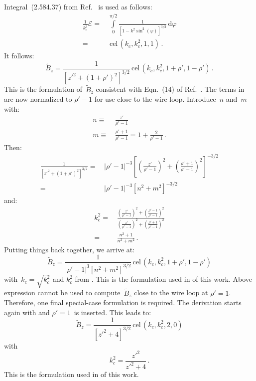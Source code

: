 Integral~(2.584.37) from Ref.~\cite{gradshteyn_ryzhik} is used as follows:
\begin{align}
  \frac{1}{k_c^2} \mathcal{E}
 =&\, \int\limits_0^{\pi/2}
        \frac{1}{\left[ 1 - k^2 \sin^2(\varphi) \right]^{3/2}}
        \,\mathrm{d}\varphi \nonumber \\
 =&\, \,\textrm{cel}\,(k_c, k_c^2, 1, 1) \, .
\end{align}
It follows:
\begin{equation}
  \tilde{B}_z
 = \frac{1}{\left[z'^2 + (1 + \rho')^2\right]^{3/2}} \,\textrm{cel}\,(k_c, k_c^2, 1 + \rho', 1 - \rho') \, . \label{eqn:cwl_B_z_14}
\end{equation}
This is the formulation of~$\tilde{B}_z$ consistent with Eqn.~(14) of Ref.~\cite{walstrom_2017}.
The terms in~ are now normalized to $\rho'-1$ for use close to the wire loop.
Introduce~$n$ and~$m$ with:
\begin{align}
  n \equiv&\, \frac{z'}{\rho'-1} \\
  m \equiv&\, \frac{\rho' + 1}{\rho'-1}
    = 1 + \frac{2}{\rho' - 1} \, .
\end{align}
Then:
\begin{align}
  \frac{1}{\left[z'^2 + (1 + \rho')^2\right]^{3/2}}
 =&\, \left| \rho' - 1 \right|^{-3} \left[ \left(\frac{z'}{\rho'-1}\right)^2 + \left( \frac{\rho' + 1}{\rho'-1} \right)^2 \right]^{-3/2} \nonumber \\
 =&\, \left| \rho' - 1 \right|^{-3} \left[ n^2 + m^2 \right]^{-3/2}
\end{align}
and:
\begin{align}
  k_c^2
 =&\, \frac{\left(\frac{z'}{\rho'-1}\right)^2 + \left( \frac{\rho' - 1}{\rho'-1} \right)^2}
           {\left(\frac{z'}{\rho'-1}\right)^2 + \left( \frac{\rho' + 1}{\rho'-1} \right)^2} \nonumber \\
 =&\, \frac{n^2 + 1}
           {n^2 + m^2} \, . \label{eqn:cwl_B_z_n_kCSq}
\end{align}
Putting things back together, we arrive at:
\begin{equation}
  \tilde{B}_z
 = \frac{1}{\left| \rho' - 1 \right|^3 \left[ n^2 + m^2 \right]^{3/2} } \,\textrm{cel}\,(k_c, k_c^2, 1 + \rho', 1 - \rho')
\end{equation}
with~$k_c = \sqrt{k_c^2}$ and $k_c^2$ from .
This is the formulation used in  of this work.
Above expression cannot be used to compute~$\tilde{B}_z$ close to the wire loop at $\rho'=1$.
Therefore, one final special-case formulation is required.
The derivation starts again with  and $\rho'=1$~is inserted.
This leads to:
\begin{equation}
  \tilde{B}_z = \frac{1}{\left[ z'^2 + 4 \right]^{3/2}} \,\textrm{cel}\,(k_c, k_c^2, 2, 0)
\end{equation}
with
\begin{equation}
  k_c^2 = \frac{z'^2}{z'^2 + 4} \, .
\end{equation}
This is the formulation used in  of this work.

